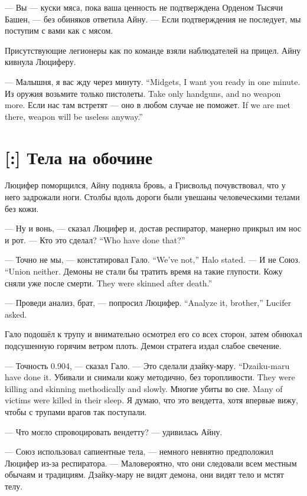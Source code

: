 --- Вы --- куски мяса, пока ваша ценность не подтверждена Орденом Тысячи Башен, --- без обиняков ответила Айну.
--- Если подтверждения не последует, мы поступим с вами как с мясом.

Присутствующие легионеры как по команде взяли наблюдателей на прицел.
Айну кивнула Люциферу.

{--- Малышня, я вас жду через минуту.}
{``Midgets, I want you ready in one minute.}
{Из оружия возьмите только пистолеты.}
{Take only handguns, and no weapon more.}
{Если нас там встретят --- оно в любом случае не поможет.}
{If we are met there, weapon will be useless anyway.''}

\section{[:] Тела на обочине}

\textspace

Люцифер поморщился, Айну подняла бровь, а Грисвольд почувствовал, что у него задрожали ноги.
Столбы вдоль дороги были увешаны человеческими телами без кожи.

--- Ну и вонь, --- сказал Люцифер и, достав респиратор, манерно прикрыл им нос и рот.
{--- Кто это сделал?}
{``Who have done that?''}

{--- Точно не мы, --- констатировал Гало.}
{``We've not,'' Halo stated.}
{--- И не Союз.}
{``Union neither.}
Демоны не стали бы тратить время на такие глупости.
{Кожу сняли уже после смерти.}
{They were skinned after death.''}

{--- Проведи анализ, брат, --- попросил Люцифер.}
{``Analyze it, brother,'' Lucifer asked.}

Гало подошёл к трупу и внимательно осмотрел его со всех сторон, затем обнюхал подсушенную горячим ветром плоть.
Демон стратега издал слабое свечение.

--- Точность 0.904, --- сказал Гало.
{--- Это сделали дзайку-мару.}
{``Dzaiku-maru have done it.}
{Убивали и снимали кожу методично, без торопливости.}
{They were killing and skinning methodically and slowly.}
{Многие убиты во сне.}
{Many of victims were killed in their sleep.}
Я думаю, что это вендетта, хотя впервые вижу, чтобы с трупами врагов так поступали.

--- Что могло спровоцировать вендетту? --- удивилась Айну.

--- Союз использовал сапиентные тела, --- немного невнятно предположил Люцифер из-за респиратора.
--- Маловероятно, что они следовали всем местным обычаям и традициям.
Дзайку-мару не видят демона, они видят тело и мстят телу.

